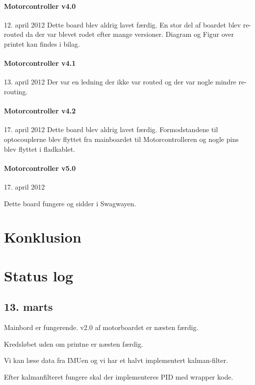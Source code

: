 \documentclass[a4paper,oneside,article,danish,table,draft]{memoir}
\newcommand{\boarddate}[1]{\textcolor{blue!80!black}{#1}}
\begin{document}
\subsubsection{Motorcontroller v4.0}
\boarddate{12. april 2012} Dette board blev aldrig lavet færdig. En stor del af boardet blev re-routed da der var blevet rodet efter mange versioner. Diagram og Figur over printet kan findes i bilag. 

\subsubsection{Motorcontroller v4.1}
\boarddate{13. april 2012}
Der var en ledning der ikke var routed og der var nogle mindre re-routing.

\subsubsection{Motorcontroller v4.2}
\boarddate{17. april 2012} Dette board blev aldrig lavet færdig.
Formodstandene til optocouplerne blev flyttet fra mainboardet til Motorcontrolleren og nogle pins blev flyttet i fladkablet.

\subsubsection{Motorcontroller v5.0}
\boarddate{17. april 2012}

Dette board fungere og sidder i Swagwayen.


\chapter{Konklusion} \label{chap:kon}
\clearpage
\listoftables
\listoffigures
 
\clearpage \appendix

\chapter{Status log}

\section{13. marts}
Mainbord er fungerende. v2.0 af motorboardet er næsten færdig.

Kredsløbet uden om printne er næsten færdig.

Vi kan læse data fra IMUen og vi har et halvt implementert kalman-filter.

Efter kalmanfilteret fungere skal der implementeres PID med wrapper kode.
\end{document}
